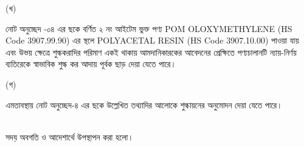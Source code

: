 \documentclass[12pt]{article}
\begin{document}
\begin{minipage}[t]{0.05\linewidth}
\hspace{0em}
\end{minipage}
\begin{minipage}[t]{0.05\linewidth}
(খ)
\end{minipage}
\begin{minipage}[t]{0.90\linewidth}
নোট অনুচ্ছেদ -০৪ এর ছকে বর্ণিত ২ নং আইটেম ভুক্ত পণ্য POM OLOXYMETHYLENE (HS Code 3907.99.90) এর স্থলে POLYACETAL RESIN (HS Code 3907.10.00) পাওয়া যায় এবং উভয় ক্ষেত্রে শুল্ককরাদির পরিমাণ একই থাকায় আমদানিকারকের আবেদনের প্রেক্ষিতে পণ্যচালানটি ন্যায়-নির্ণয় ব্যতিরেকে স্বাভাবিক শুল্ক কর আদায় পূর্বক ছাড় দেয়া যেতে পারে।
\\
\end{minipage}
\begin{minipage}[t]{0.05\linewidth}
\hspace{0em}
\end{minipage}
\begin{minipage}[t]{0.05\linewidth}
(গ)
\end{minipage}
\begin{minipage}[t]{0.90\linewidth}
এমতাবস্থায় নোট অনুচ্ছেদ-৪ এর ছকে উল্লেখিত তথ্যাদির আলোকে শুল্কায়নের অনুমোদন দেয়া যেতে পারে।
\\
\\
\end{minipage}
\begin{minipage}[t]{0.05\linewidth}
\hspace{0em}
\end{minipage}
\begin{minipage}[t]{0.95\linewidth}
সদয় অবগতি ও আদেশার্থে উপস্থাপন করা
হলো।
\end{minipage}
\end{document}
